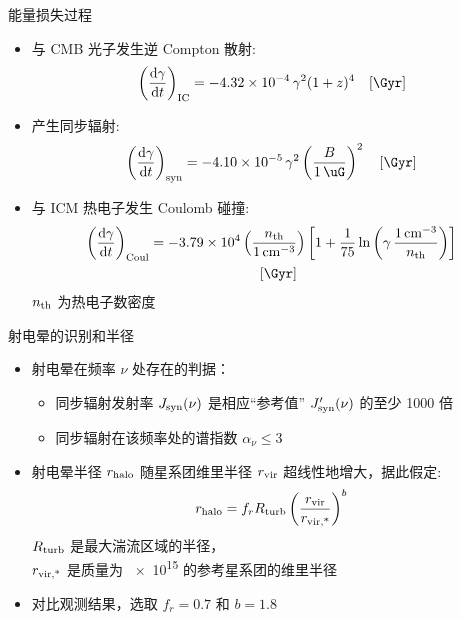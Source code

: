 \documentclass{beamer}
\begin{document}
\begin{frame}
  \vspace{1ex}
  \begin{alertblock}{能量损失过程}
    \smallskip
    \begin{itemize}
      \item 与 CMB 光子发生逆 Compton 散射:
        \begin{equation}
          \left( \diff{\gamma}{t} \right)_{\R{IC}} =
            \num{-4.32e-4} \,\gamma^2 (1+z)^4
            \quad [\si{\per\Gyr}]
        \end{equation}
      \item 产生同步辐射:
        \begin{equation}
          \left( \diff{\gamma}{t} \right)_{\R{syn}} =
            \num{-4.10e-5} \,\gamma^2
            \left( \frac{B}{\SI{1}{\uG}} \right)^2
            \quad [\si{\per\Gyr}]
        \end{equation}
      \item 与 ICM 热电子发生 Coulomb 碰撞:
        \begin{multline}
          \left( \diff{\gamma}{t} \right)_{\R{Coul}} =
            \num{-3.79e4} \left( \frac{n_{\R{th}}}{\SI{1}{\per\cm\cubed}} \right)
            \left[ 1 + \frac{1}{75} \ln \left(
              \gamma\,\frac{\SI{1}{\per\cm\cubed}}{n_{\R{th}}} \right) \right]
            \\ \quad [\si{\per\Gyr}]
        \end{multline}
        $n_{\text{th}}$ 为热电子数密度
    \end{itemize}
  \end{alertblock}
\end{frame}

\begin{frame}{射电晕的识别和半径}
  \begin{itemize}
    \item 射电晕在频率 $\nu$ 处存在的判据：
      \begin{itemize}
        \item 同步辐射发射率 $J_{\text{syn}}(\nu)$
          是相应\enquote{参考值} $J'_{\text{syn}}(\nu)$ 的至少 1000 倍
        \item 同步辐射在该频率处的谱指数 $\alpha_{\nu} \le 3$
      \end{itemize}

    \item 射电晕半径 $r_{\text{halo}}$ 随星系团维里半径 $r_{\text{vir}}$
      超线性地增大，据此假定:
      \begin{equation}
        r_{\text{halo}} = f_r R_{\text{turb}}
          \left( \frac{r_{\text{vir}}}{r_{\text{vir,*}}} \right)^b
      \end{equation}
      $R_{\text{turb}}$ 是最大湍流区域的半径，\\
      $r_{\text{vir,*}}$ 是质量为 \SI{e15}{\solarmass} 的参考星系团的维里半径
    \item 对比观测结果，选取 $f_r = 0.7$ 和 $b = 1.8$
  \end{itemize}
\end{frame}
\end{document}
